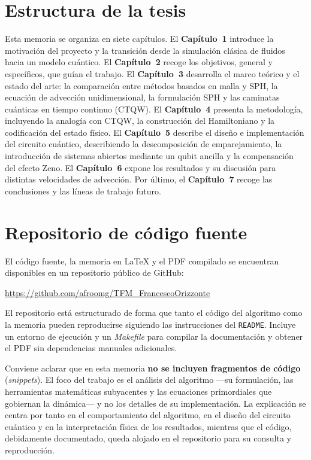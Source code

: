 
\section*{Estructura de la tesis}
\noindent Esta memoria se organiza en siete capítulos. El \textbf{Capítulo~1} introduce la motivación del proyecto y la transición desde la simulación clásica de fluidos hacia un modelo cuántico. El \textbf{Capítulo~2} recoge los objetivos, general y específicos, que guían el trabajo. El \textbf{Capítulo~3} desarrolla el marco teórico y el estado del arte: la comparación entre métodos basados en malla y SPH, la ecuación de advección unidimensional, la formulación SPH y las caminatas cuánticas en tiempo continuo (CTQW). El \textbf{Capítulo~4} presenta la metodología, incluyendo la analogía con CTQW, la construcción del Hamiltoniano y la codificación del estado físico. El \textbf{Capítulo~5} describe el diseño e implementación del circuito cuántico, describiendo la descomposición de emparejamiento, la introducción de sistemas abiertos mediante un qubit ancilla y la compensación del efecto Zeno. El \textbf{Capítulo~6} expone los resultados y su discusión para distintas velocidades de advección. Por último, el \textbf{Capítulo~7} recoge las conclusiones y las líneas de trabajo futuro.
\bigskip

\section*{Repositorio de código fuente}
\noindent El código fuente, la memoria en \LaTeX{} y el PDF compilado se encuentran disponibles en un repositorio público de GitHub:
\begin{center}
\href{https://github.com/afroomg/TFM_FrancescoOrizzonte}{\url{https://github.com/afroomg/TFM_FrancescoOrizzonte}}
\end{center}

\noindent El repositorio está estructurado de forma que tanto el código del algoritmo como la memoria pueden reproducirse siguiendo las instrucciones del \texttt{README}. Incluye un entorno de ejecución y un \textit{Makefile} para compilar la documentación y obtener el PDF sin dependencias manuales adicionales.

\medskip\noindent
Conviene aclarar que en esta memoria \textbf{no se incluyen fragmentos de código} (\textit{snippets}). El foco del trabajo es el análisis del algoritmo ---su formulación, las herramientas matemáticas subyacentes y las ecuaciones primordiales que gobiernan la dinámica--- y no los detalles de su implementación. La explicación se centra por tanto en el comportamiento del algoritmo, en el diseño del circuito cuántico y en la interpretación física de los resultados, mientras que el código, debidamente documentado, queda alojado en el repositorio para su consulta y reproducción.
